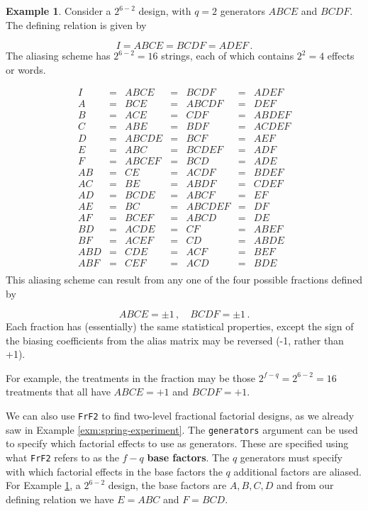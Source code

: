 \documentclass[
]{book}
\theoremstyle{definition}
\theoremstyle{definition}
\newtheorem{example}{Example}[chapter]
\theoremstyle{definition}
\theoremstyle{definition}
\theoremstyle{remark}
\begin{document}
\begin{example}
\protect\hypertarget{exm:frac-illustrative}{}\label{exm:frac-illustrative}Consider a \(2^{6-2}\) design, with \(q=2\) generators \(ABCE\) and \(BCDF\). The defining relation is given by

\[
I = ABCE = BCDF = ADEF\,.
\]
The aliasing scheme has \(2^{6-2} = 16\) strings, each of which contains \(2^2 = 4\) effects or words.

\[
\begin{array}{ccccccc}
I & = & ABCE & = & BCDF & = & ADEF \\
A & = & BCE & = & ABCDF & = & DEF \\
B & = & ACE & = & CDF & = & ABDEF \\
C & = & ABE & = & BDF & = & ACDEF \\
D & = & ABCDE & = & BCF & = & AEF \\
E & = & ABC & = & BCDEF & = & ADF \\
F & = & ABCEF & = & BCD & = & ADE \\
AB & = & CE & = & ACDF & = & BDEF \\
AC & = & BE & = & ABDF & = & CDEF \\
AD & = & BCDE & = & ABCF & = & EF \\
AE & = & BC & = & ABCDEF & = & DF \\
AF & = & BCEF & = & ABCD & = & DE \\
BD & = & ACDE & = & CF & = & ABEF \\
BF & = & ACEF & = & CD & = & ABDE \\
ABD & = & CDE & = & ACF & = & BEF \\
ABF & = & CEF & = & ACD & = & BDE \\
\end{array}
\]
This aliasing scheme can result from any one of the four possible fractions defined by

\[
ABCE = \pm 1\,,\quad BCDF = \pm 1\,.
\]
Each fraction has (essentially) the same statistical properties, except the sign of the biasing coefficients from the alias matrix may be reversed (-1, rather than +1).

For example, the treatments in the fraction may be those \(2^{f-q} = 2^{6-2} = 16\) treatments that all have \(ABCE = +1\) and \(BCDF = +1\).
\end{example}

We can also use \texttt{FrF2} to find two-level fractional factorial designs, as we already saw in Example \ref{exm:spring-experiment}. The \texttt{generators} argument can be used to specify which factorial effects to use as generators. These are specified using what \texttt{FrF2} refers to as the \(f-q\) \textbf{base factors}. The \(q\) generators must specify with which factorial effects in the base factors the \(q\) additional factors are aliased.\\
For Example \ref{exm:frac-illustrative}, a \(2^{6-2}\) design, the base factors are \(A, B, C, D\) and from our defining relation we have \(E = ABC\) and \(F = BCD\).
\end{document}
